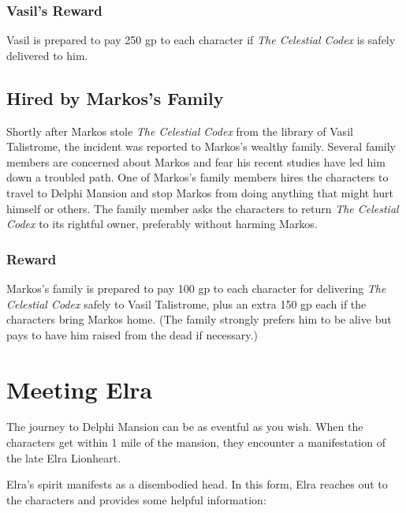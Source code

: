 \documentclass[10pt,a4paper,twoside,bg=print,twocolumn,openany,nodeprecatedcode]{dndbook}
\begin{document}
\subsubsection{Vasil's Reward}
Vasil is prepared to pay 250 gp to each character if \textit{The Celestial Codex} is safely delivered to him.

\subsection{Hired by Markos's Family}
Shortly after Markos stole \textit{The Celestial Codex} from the library of Vasil Talistrome, the incident was reported to Markos's wealthy family. Several family members are concerned about Markos and fear his recent studies have led him down a troubled path. One of Markos's family members hires the characters to travel to Delphi Mansion and stop Markos from doing anything that might hurt himself or others. The family member asks the characters to return \textit{The Celestial Codex} to its rightful owner, preferably without harming Markos.

\subsubsection{Reward}
Markos's family is prepared to pay 100 gp to each character for delivering \textit{The Celestial Codex} safely to Vasil Talistrome, plus an extra 150 gp each if the characters bring Markos home. (The family strongly prefers him to be alive but pays to have him raised from the dead if necessary.)

\section{Meeting Elra}
The journey to Delphi Mansion can be as eventful as you wish. When the characters get within 1 mile of the mansion, they encounter a manifestation of the late Elra Lionheart.

Elra's spirit manifests as a disembodied head. In this form, Elra reaches out to the characters and provides some helpful information:
\end{document}
